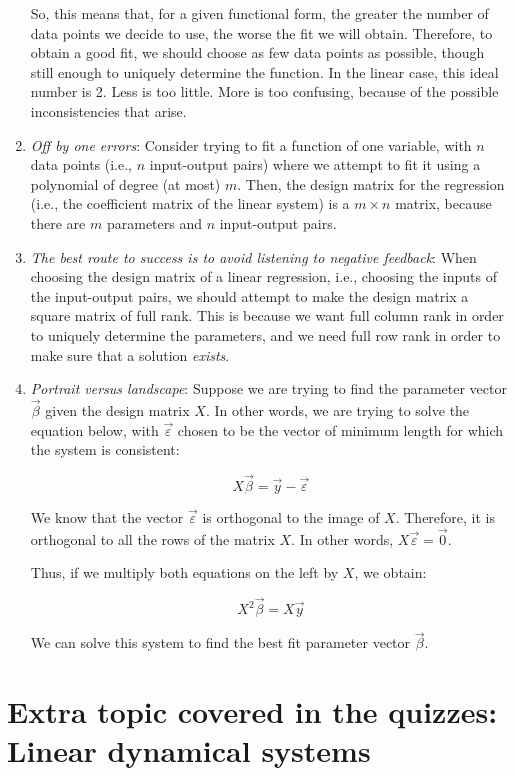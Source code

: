 \documentclass[10pt]{amsart}
\begin{document}
\begin{enumerate}
  So, this means that, for a given functional form, the greater the
  number of data points we decide to use, the worse the fit we will
  obtain. Therefore, to obtain a good fit, we should choose as few
  data points as possible, though still enough to uniquely determine
  the function. In the linear case, this ideal number is 2. Less is
  too little. More is too confusing, because of the possible
  inconsistencies that arise.
\item {\em Off by one errors}: Consider trying to fit a function of
  one variable, with $n$ data points (i.e., $n$ input-output pairs)
  where we attempt to fit it using a polynomial of degree (at most)
  $m$. Then, the design matrix for the regression (i.e., the
  coefficient matrix of the linear system) is a $m \times n$ matrix,
  because there are $m$ parameters and $n$ input-output pairs.
\item {\em The best route to success is to avoid listening to negative
  feedback}: When choosing the design matrix of a linear regression,
  i.e., choosing the inputs of the input-output pairs, we should
  attempt to make the design matrix a square matrix of full rank. This
  is because we want full column rank in order to uniquely determine
  the parameters, and we need full row rank in order to make sure that
  a solution {\em exists}.
\item {\em Portrait versus landscape}: Suppose we are trying to find
  the parameter vector $\vec{\beta}$ given the design matrix $X$. In
  other words, we are trying to solve the equation below, with
  $\vec{\varepsilon}$ chosen to be the vector of minimum length for
  which the system is consistent:

  $$X\vec{\beta} = \vec{y} - \vec{\varepsilon}$$

  We know that the vector $\vec{\varepsilon}$ is orthogonal to the
  image of $X$. Therefore, it is orthogonal to all the rows of the
  matrix $X$. In other words, $X\vec{\varepsilon} = \vec{0}$.

  Thus, if we multiply both equations on the left by $X$, we obtain:

  $$X^2\vec{\beta} = X\vec{y}$$

  We can solve this system to find the best fit parameter vector
  $\vec{\beta}$.
\end{enumerate}

\section{Extra topic covered in the quizzes: Linear dynamical systems}
\end{document}
